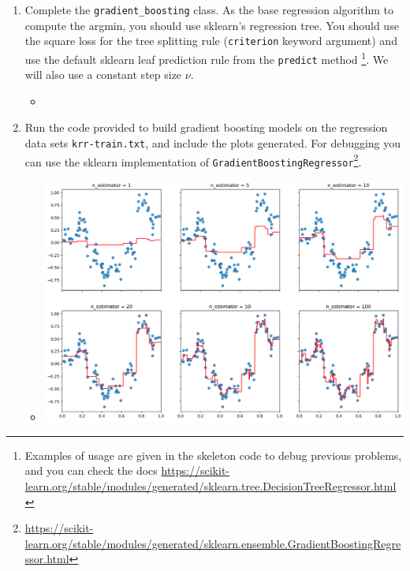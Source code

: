 \documentclass{article}
\theoremstyle{plain}
\theoremstyle{definition}
\begin{document}
\begin{enumerate}
\setcounter{enumi}{\value{saveenum}}
  
\item Complete the \texttt{gradient\_boosting} class. As the base regression
algorithm to compute the argmin, you should use sklearn's regression tree. You should use
the square loss for the tree splitting rule (\texttt{criterion} keyword argument) and use the default sklearn leaf prediction rule from the \texttt{predict} method \footnote{Examples of usage are given in the skeleton code to debug previous problems, and you can check the docs \url{https://scikit-learn.org/stable/modules/generated/sklearn.tree.DecisionTreeRegressor.html}}. We will also use a constant step size $\nu$.\\

 \begin{itemize}
           \color{blue}
               \item 
           \inputminted[firstline=440, lastline=492, breaklines=True]{python}{hw6.py}
\end{itemize}



\item Run the code provided to build gradient
boosting models on the regression data sets \texttt{krr-train.txt}, and
include the plots generated. For debugging you can use the sklearn implementation of \texttt{GradientBoostingRegressor}\footnote{\url{https://scikit-learn.org/stable/modules/generated/sklearn.ensemble.GradientBoostingRegressor.html}}.
\setcounter{saveenum}{\value{enumi}}\\


 \begin{itemize}
           \color{blue}
               \item 
           \includegraphics[width=15cm]{homework/homework_6/images/hw6_4.png}
\end{itemize}


\end{enumerate}
\end{document}
